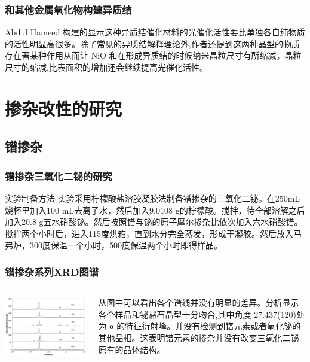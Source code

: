 \documentclass[xetex,compress]{mybeamer}
\begin{document}
\begin{frame}
\frametitle{和其他金属氧化物构建异质结}
\begin{block}{}
Abdul Hameed 构建的显示这种异质结催化材料的光催化活性要比单独各自纯物质的活性明显高很多。除了常见的异质结解释理论外,作者还提到这两种晶型的物质存在著某种作用从而让 NiO 和在形成异质结的时候纳米晶粒尺寸有所缩减。晶粒尺寸的缩减,比表面积的增加还会继续提高光催化活性。
\end{block}
\end{frame}


\section{掺杂改性的研究}
\subsection{镨掺杂}
\begin{frame}
\frametitle{镨掺杂三氧化二铋的研究}
\begin{block}{实验制备方法}
实验采用柠檬酸盐溶胶凝胶法制备镨掺杂的三氧化二铋。在250mL烧杯里加入100 mL去离子水，然后加入9.0108 g的柠檬酸。搅拌，待全部溶解之后加入20.8 g五水硝酸铋。然后按照镨与铋的原子摩尔掺杂比依次加入六水硝酸镨。搅拌两个小时后，进入115度烘箱，直到水分完全蒸发，形成干凝胶。然后放入马弗炉，300度保温一个小时，500度保温两个小时即得样品。
\end{block}
\end{frame}

\begin{frame}
\frametitle{镨掺杂系列XRD图谱}
\begin{columns}
\begin{block}{}
\centering
\includegraphics[width=\linewidth]{figures/镨掺杂XRD.jpg} 
\end{block}
\begin{block}{}
从图中可以看出各个谱线并没有明显的差异。分析显示各个样品和铋赭石晶型十分吻合,其中角度 27.437(120)处为 α-的特征衍射峰。并没有检测到镨元素或者氧化铋的其他晶相。这表明镨元素的掺杂并没有改变三氧化二铋原有的晶体结构。
\end{block}
\end{columns}
\end{frame}
\end{document}

